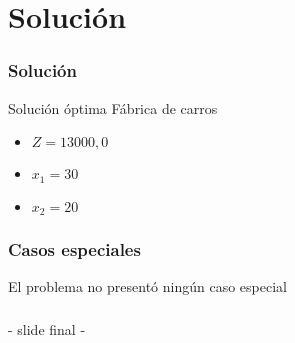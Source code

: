\documentclass{beamer}
\begin{document}
\section{Solución} 
\begin{frame} 
\frametitle{Solución} 
\begin{exampleblock}{Solución óptima} 
{\scriptsize Fábrica de carros
} 
\begin{itemize} 
\item $Z = 13000,0$ 
\item $x_{1} = 30$ 
\item $x_{2} = 20$ 
\end{itemize} 
\end{exampleblock} 
\end{frame} 


\begin{frame} 
\frametitle{Casos especiales} 
El problema no presentó ningún caso especial 
\end{frame} 

\begin{frame}\frametitle{}\begin{center}{\Huge - slide final -}\end{center}\end{frame} 
\end{document}
